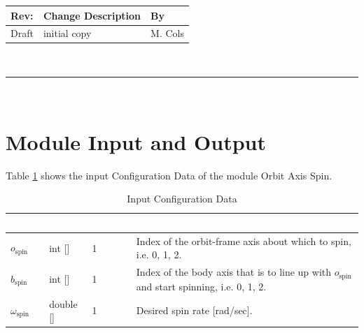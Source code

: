 \documentclass[]{AVSSimReportMemo}
\begin{document}
\makeCover


%
%
\pagestyle{empty}
{\renewcommand{\arraystretch}{2}
\noindent
\begin{longtable}{|p{0.5in}|p{4.5in}|p{1.14in}|}
\hline
{\bfseries Rev}: & {\bfseries Change Description} & {\bfseries By} \\
\hline
Draft & initial copy & M. Cols \\
\hline

\end{longtable}
}

\newpage
\setcounter{page}{1}
\pagestyle{fancy}

\tableofcontents
~\\ \hrule ~\\

\section{Module Input and Output}
Table \ref{tab:inputConfigTable} shows the input Configuration Data of the module Orbit Axis Spin.
\begin{table}[h!]
	\centering
	\caption{Input Configuration Data}
	\begin{tabular}{|l|l|l|p{3in}|}
		\hline
		\rowcolor{BrickRed}
		\textcolor{white}{Name} & \textcolor{white}{Type} & 
		\textcolor{white}{Length} & 
		\textcolor{white}{Description}  \\ \hline
		$o_{\textrm{spin}}$ & int [] & 1 & 
		Index of the orbit-frame axis about which to spin, i.e. 0, 1, 2. \\ \hline
		$b_{\textrm{spin}}$ & int [] & 1 & 
		Index of the body axis that is to line up with $o_{ \textrm{spin}}$ and start spinning,  i.e. 0, 1, 2. \\ \hline
		$\omega_{\textrm{spin}}$ & double [] & 1 & 
		Desired spin rate [rad/sec]. \\ \hline
	\end{tabular} 
	\label{tab:inputConfigTable}
\end{table}
\end{document}
